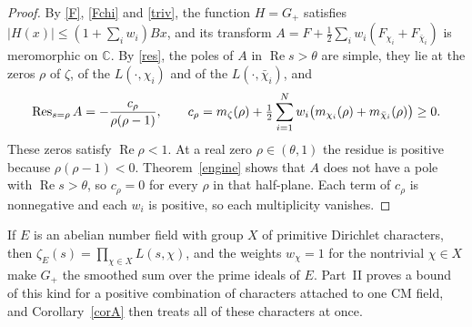 \begin{proof}
By \eqref{F}, \eqref{Fchi} and \eqref{triv}, the function $H=G_+$ satisfies $\lvert H(x)\rvert\le(1+\sum_iw_i)Bx$, and its transform $A=F+\frac12\sum_iw_i(F_{\chi_i}+F_{\bar\chi_i})$ is meromorphic on $\mathbb C$. By \eqref{res}, the poles of $A$ in $\operatorname{Re}s>\theta$ are simple, they lie at the zeros $\rho$ of $\zeta$, of the $L(\cdot,\chi_i)$ and of the $L(\cdot,\bar\chi_i)$, and
\[
\operatorname{Res}_{s=\rho}A=-\frac{c_\rho}{\rho(\rho-1)},\qquad c_\rho=m_\zeta(\rho)+\tfrac12\sum_{i=1}^Nw_i\big(m_{\chi_i}(\rho)+m_{\bar\chi_i}(\rho)\big)\ge0 .
\]
These zeros satisfy $\operatorname{Re}\rho<1$. At a real zero $\rho\in(\theta,1)$ the residue is positive because $\rho(\rho-1)<0$. Theorem~\ref{engine} shows that $A$ does not have a pole with $\operatorname{Re}s>\theta$, so $c_\rho=0$ for every $\rho$ in that half-plane. Each term of $c_\rho$ is nonnegative and each $w_i$ is positive, so each multiplicity vanishes.
\end{proof}

If $E$ is an abelian number field with group $X$ of primitive Dirichlet characters, then $\zeta_E(s)=\prod_{\chi\in X}L(s,\chi)$, and the weights $w_\chi=1$ for the nontrivial $\chi\in X$ make $G_+$ the smoothed sum over the prime ideals of $E$. Part~II proves a bound of this kind for a positive combination of characters attached to one CM field, and Corollary~\ref{corA} then treats all of these characters at once.
